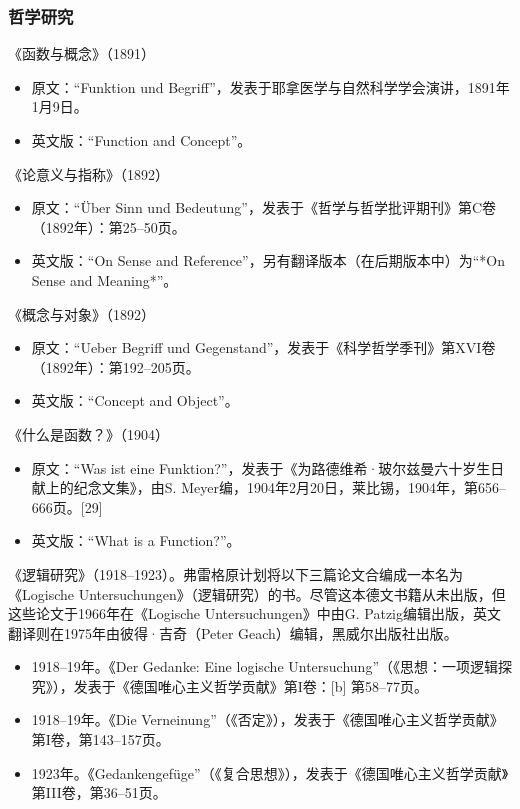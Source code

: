 \subsubsection{哲学研究}  
《函数与概念》（1891）
\begin{itemize}
\item 原文：“Funktion und Begriff”，发表于耶拿医学与自然科学学会演讲，1891年1月9日。  
\item 英文版：“Function and Concept”。
\end{itemize}
《论意义与指称》（1892）
\begin{itemize}
\item 原文：“Über Sinn und Bedeutung”，发表于《哲学与哲学批评期刊》第C卷（1892年）：第25–50页。  
\item 英文版：“On Sense and Reference”，另有翻译版本（在后期版本中）为“*On Sense and Meaning*”。
\end{itemize}
《概念与对象》（1892）
\begin{itemize}
\item 原文：“Ueber Begriff und Gegenstand”，发表于《科学哲学季刊》第XVI卷（1892年）：第192–205页。  
\item 英文版：“Concept and Object”。
\end{itemize}
《什么是函数？》（1904）
\begin{itemize}
\item 原文：“Was ist eine Funktion?”，发表于《为路德维希·玻尔兹曼六十岁生日献上的纪念文集》，由S. Meyer编，1904年2月20日，莱比锡，1904年，第656–666页。[29]  
\item 英文版：“What is a Function?”。
\end{itemize}
《逻辑研究》（1918–1923）。弗雷格原计划将以下三篇论文合编成一本名为《Logische Untersuchungen》（逻辑研究）的书。尽管这本德文书籍从未出版，但这些论文于1966年在《Logische Untersuchungen》中由G. Patzig编辑出版，英文翻译则在1975年由彼得·吉奇（Peter Geach）编辑，黑威尔出版社出版。
\begin{itemize}
\item 1918–19年。《Der Gedanke: Eine logische Untersuchung”（《思想：一项逻辑探究》），发表于《德国唯心主义哲学贡献》第I卷：[b] 第58–77页。  
\item 1918–19年。《Die Verneinung”（《否定》），发表于《德国唯心主义哲学贡献》第I卷，第143–157页。  
\item 1923年。《Gedankengefüge”（《复合思想》），发表于《德国唯心主义哲学贡献》第III卷，第36–51页。
\end{itemize}